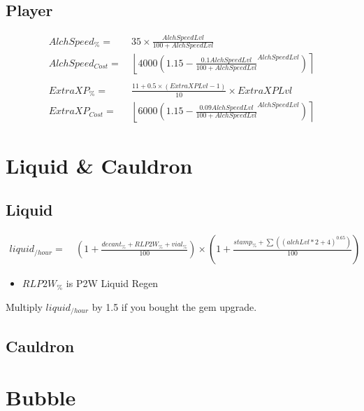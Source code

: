         \subsection{Player}
            \begin{align*}
                AlchSpeed_\% = &\ 35 \times \frac{AlchSpeedLvl}{100+AlchSpeedLvl} 
                \\ 
                AlchSpeed_{Cost} = &\ 
                    \left\lfloor 
                        4000\left(1.15-\frac{0.1AlchSpeedLvl}{100+AlchSpeedLvl}^{AlchSpeedLvl}\right) 
                    \right\rceil 
                \\ 
                \\
                ExtraXP_\% = &\ \frac{11 + 0.5 \times (ExtraXPLvl-1)}{10} \times ExtraXPLvl
                \\
                ExtraXP_{Cost} = &\ 
                \left\lfloor 
                    6000\left(1.15-\frac{0.09AlchSpeedLvl}{100+AlchSpeedLvl}^{AlchSpeedLvl}\right) 
                \right\rceil 
            \end{align*}
    \section{Liquid \& Cauldron}
        \subsection{Liquid}
            \begin{align*}
                liquid_{/hour} = &\ 
                    \left( 1 + \frac{ decant_\% + RLP2W_\% + vial_\% }{100} \right)
                    \times 
                    \left( 1+ \frac{ stamp_\% + \sum \left( (alchLvl * 2 + 4 )^{0.65} \right) }{100} \right)
            \end{align*}
            \begin{itemize}
                \item $RLP2W_\%$ is P2W Liquid Regen
            \end{itemize}
            Multiply $liquid_{/hour}$ by 1.5 if you bought the gem upgrade.
        

        \subsection{Cauldron}

    \section{Bubble}
